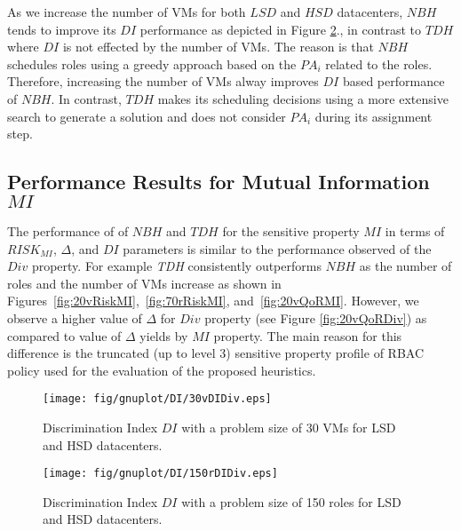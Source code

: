 As we increase the number of VMs for both $LSD$ and $HSD$ datacenters,   $NBH$ tends to improve its $DI$ performance as depicted in Figure \ref{fig:150rDIDiv}., in contrast to $TDH$ where $DI$ is not  effected by the number of VMs. The reason is that  $NBH$ schedules roles using  a greedy approach  based on the $PA_i$ related to the roles. Therefore, increasing the number of VMs alway improves  $DI$ based performance of $NBH$.  In contrast, $TDH$  makes its  scheduling decisions using a more extensive search to generate a solution and  does not consider $PA_i$ during its assignment step.


\subsection{Performance Results for Mutual Information $MI$}

The performance of  of $NBH$ and $TDH$ for the sensitive property  $MI$ in terms of  $RISK_{MI}$,  $\Delta$, and $DI$ parameters is similar to the performance observed of the  $Div$ property. For example \textit{TDH} consistently outperforms $NBH$ as the number of roles and the number of VMs increase as shown in  Figures~\ref{fig:20vRiskMI},~\ref{fig:70rRiskMI}, and~\ref{fig:20vQoRMI}.  However,  we observe a higher value of $\Delta$ for $Div$ property (see Figure \ref{fig:20vQoRDiv}) as compared to value of $\Delta$ yields by $MI$ property. The main reason for  this difference is  the truncated  (up to level 3) sensitive property profile of RBAC policy  used for the evaluation of the proposed heuristics.


\begin{figure}[t!]
    \begin{center}
        \texttt{[image: fig/gnuplot/DI/30vDIDiv.eps]}
        \caption{Discrimination Index  $DI$ with a problem size of 30 VMs  for LSD and  HSD datacenters.} 
        \label{fig:30vDIDiv}
        \vspace{-1.0em}
     \end{center}         
\end{figure} 

\begin{figure}[t!]
    \begin{center}
        \texttt{[image: fig/gnuplot/DI/150rDIDiv.eps]}
        \caption{Discrimination Index  $DI$ with a problem size of 150 roles  for LSD and  HSD datacenters.} 
        \label{fig:150rDIDiv}
        \vspace{-2.0em}
     \end{center}         
\end{figure} 

